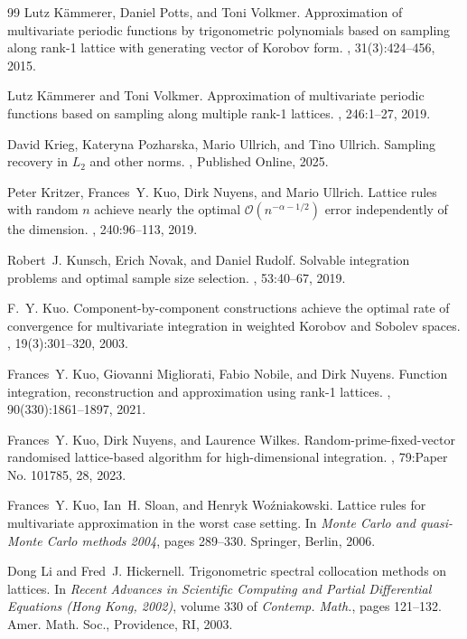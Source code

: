 \documentclass[a4paper,11pt]{article}
\begin{document}
\begin{thebibliography}{99}
Lutz K\"{a}mmerer, Daniel Potts, and Toni Volkmer.
\newblock Approximation of multivariate periodic functions by trigonometric
  polynomials based on sampling along rank-1 lattice with generating vector of
  {K}orobov form.
, 31(3):424--456, 2015.

Lutz K\"{a}mmerer and Toni Volkmer.
\newblock Approximation of multivariate periodic functions based on sampling
  along multiple rank-1 lattices.
, 246:1--27, 2019.

David Krieg, Kateryna Pozharska, Mario Ullrich, and Tino Ullrich.
\newblock Sampling recovery in {$L_2$} and other norms.
, Published Online, 2025.

Peter Kritzer, Frances~Y. Kuo, Dirk Nuyens, and Mario Ullrich.
\newblock Lattice rules with random {$n$} achieve nearly the optimal
  {$\mathcal{O}(n^{-\alpha-1/2})$} error independently of the dimension.
, 240:96--113, 2019.

Robert~J. Kunsch, Erich Novak, and Daniel Rudolf.
\newblock Solvable integration problems and optimal sample size selection.
, 53:40--67, 2019.

F.~Y. Kuo.
\newblock Component-by-component constructions achieve the optimal rate of
  convergence for multivariate integration in weighted {K}orobov and {S}obolev
  spaces.
, 19(3):301--320, 2003.

Frances~Y. Kuo, Giovanni Migliorati, Fabio Nobile, and Dirk Nuyens.
\newblock Function integration, reconstruction and approximation using rank-1
  lattices.
, 90(330):1861--1897, 2021.

Frances~Y. Kuo, Dirk Nuyens, and Laurence Wilkes.
\newblock Random-prime-fixed-vector randomised lattice-based algorithm for
  high-dimensional integration.
, 79:Paper No. 101785, 28, 2023.

Frances~Y. Kuo, Ian~H. Sloan, and Henryk Wo\'zniakowski.
\newblock Lattice rules for multivariate approximation in the worst case
  setting.
\newblock In {\em Monte {C}arlo and quasi-{M}onte {C}arlo methods 2004}, pages
  289--330. Springer, Berlin, 2006.

Dong Li and Fred~J. Hickernell.
\newblock Trigonometric spectral collocation methods on lattices.
\newblock In {\em Recent {A}dvances in {S}cientific {C}omputing and {P}artial
  {D}ifferential {E}quations ({H}ong {K}ong, 2002)}, volume 330 of {\em
  Contemp. Math.}, pages 121--132. Amer. Math. Soc., Providence, RI, 2003.


\end{thebibliography}
\end{document}
